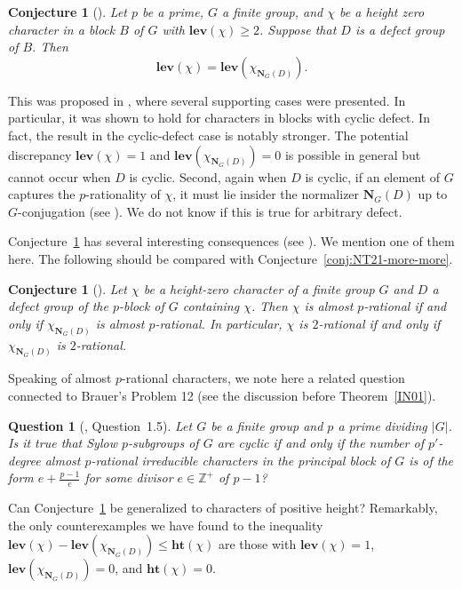 \documentclass[12pt]{amsart}
\newtheorem{conjecture}[theorem]{Conjecture}
\newtheorem{question}[theorem]{Question}
\theoremstyle{definition}
\numberwithin{equation}{section}
\newcommand{\ZZ}{{\mathbb Z}}
\newcommand{\height}{\mathbf{ht}}
\newcommand{\lev}{\mathrm{\mathbf{lev}}}
\newcommand{\bN}{{\mathbf{N}}}
\begin{document}
\begin{conjecture}[\cite{HS25}]\label{conj:Hung-SF}
Let $p$ be a prime, $G$ a finite group, and $\chi$ be a height zero
character in a block $B$ of $G$ with $\lev(\chi)\geq 2$. Suppose
that $D$ is a defect group of $B$. Then
\[\lev(\chi)=\lev(\chi_{\bN_G(D)}).\]
\end{conjecture}

This was proposed in \cite{HS25}, where several supporting cases
were presented. In particular, it was shown to hold for characters
in blocks with cyclic defect. In fact, the result in the
cyclic-defect case is notably stronger. The potential discrepancy
$\lev(\chi)=1$ and $\lev(\chi_{\mathbf{N}_G(D)})=0$ is possible in
general but cannot occur when $D$ is cyclic. Second, again when $D$
is cyclic, if an element of $G$ captures the $p$-rationality of
$\chi$, it must lie insider the normalizer $\bN_G(D)$ up to
$G$-conjugation (see \cite[\S3]{HS25}). We do not know if this is
true for arbitrary defect.

Conjecture~\ref{conj:Hung-SF} has several interesting consequences
(see \cite[\S7]{HS25}). We mention one of them here. The following
should be compared with Conjecture~\ref{conj:NT21-more-more}.

\begin{conjecture}[\cite{HS25}]
Let $\chi$ be a height-zero character of a finite group $G$ and $D$
a defect group of the $p$-block of $G$ containing $\chi$. Then
$\chi$ is almost $p$-rational if and only if $\chi_{\bN_G(D)}$ is
almost $p$-rational. In particular, $\chi$ is $2$-rational if and
only if $\chi_{\bN_G(D)}$ is $2$-rational.
\end{conjecture}

Speaking of almost $p$-rational characters, we note here a related
question connected to Brauer's Problem 12 (see the discussion before
Theorem~\ref{IN01}).

\begin{question}[\cite{Hung-Malle-Maroti21}, Question~1.5]
Let $G$ be a finite group and $p$ a prime dividing $|G|$. Is it true
that Sylow $p$-subgroups of $G$ are cyclic if and only if the number
of $p'$-degree almost $p$-rational irreducible characters in the
principal block of $G$ is of the form $e+\frac{p-1}{e}$ for some
divisor $e\in\ZZ^+$ of $p-1$?
\end{question}

Can Conjecture~\ref{conj:Hung-SF} be generalized to characters of
positive height? Remarkably, the only counterexamples we have found
to the inequality $\lev(\chi)-\lev(\chi_{\bN_G(D)})\leq
\height(\chi)$ are those with $\lev(\chi)=1$,
$\lev(\chi_{\bN_G(D)})=0$, and $\height(\chi)=0$.
\end{document}
